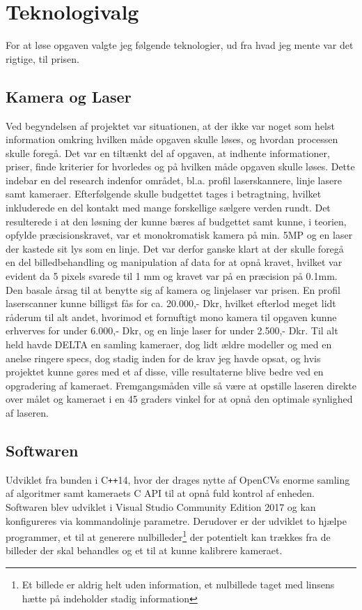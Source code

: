 \section{Teknologivalg}
For at løse opgaven valgte jeg følgende teknologier, ud fra hvad jeg mente var det rigtige, til prisen.

\newpage

\subsection{Kamera og Laser}
Ved begyndelsen af projektet var situationen, at der ikke var noget som helst information omkring hvilken måde opgaven skulle løses, og hvordan processen skulle foregå. Det var en tiltænkt del af opgaven, at indhente informationer, priser, finde kriterier for hvorledes og på hvilken måde opgaven skulle løses. Dette indebar en del research indenfor området, bl.a. profil laserskannere, linje lasere samt kameraer. Efterfølgende skulle budgettet tages i betragtning, hvilket inkluderede en del kontakt med mange forskellige sælgere verden rundt. Det resulterede i at den løsning der kunne bæres af budgettet samt kunne, i teorien, opfylde præcisionskravet, var et monokromatisk kamera på min. 5MP og en laser der kastede sit lys som en linje. Det var derfor ganske klart at der skulle foregå en del billedbehandling og manipulation af data for at opnå kravet, hvilket var evident da 5 pixels svarede til 1 mm og kravet var på en præcision på 0.1mm.
Den basale årsag til at benytte sig af kamera og linjelaser var prisen. En profil laserscanner kunne billigst fås for ca. 20.000,- Dkr, hvilket efterlod meget lidt råderum til alt andet, hvorimod et fornuftigt mono kamera til opgaven kunne erhverves for under 6.000,- Dkr, og en linje laser for under 2.500,- Dkr. Til alt held havde DELTA en samling kameraer, dog lidt ældre modeller og med en anelse ringere specs, dog stadig inden for de krav jeg havde opsat, og hvis projektet kunne gøres med et af disse, ville resultaterne blive bedre ved en opgradering af kameraet.
Fremgangsmåden ville så være at opstille laseren direkte over målet og kameraet i en 45 graders vinkel for at opnå den optimale synlighed af laseren.

\subsection{Softwaren}
Udviklet fra bunden i C\texttt{++}14, hvor der drages nytte af OpenCVs enorme samling af algoritmer samt kameraets C API til at opnå fuld kontrol af enheden. Softwaren blev udviklet i Visual Studio Community Edition 2017 og kan konfigureres via kommandolinje parametre. Derudover er der udviklet to hjælpe programmer, et til at generere nulbilleder\footnote{Et billede er aldrig helt uden information, et nulbillede taget med linsens hætte på indeholder stadig information} der potentielt kan trækkes fra de billeder der skal behandles og et til at kunne kalibrere kameraet.
